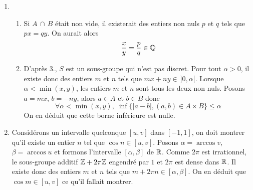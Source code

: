 \begin{enumerate}
\item
\begin{enumerate}
 \item Si $A \,\cap\, B$ {\'e}tait non vide, il existerait des entiers non nuls $p$ et $q$ tels que $px=qy$. On aurait alors
      \[\frac{x}{y}=\frac{p}{q}\in \mathbb{Q}\]
 \item D'apr{\`e}s 3., $S$ est un sous-groupe qui n'est pas discret. Pour tout $\alpha>0$, il existe donc des entiers $m$ et $n$ tels que $mx+ny\in \,]0,\alpha[$.\newline
Lorsque $\alpha < \min (x,y)$, les entiers $m$ et $n$ sont tous les deux non nuls. Posons $a=mx$, $b=-ny$, alors $a\in A$ et $b\in B$ donc
\begin{displaymath}
\forall \alpha < \min (x,y), \; \inf\{|a-b|,(a,b)\in A \times B\}\leq \alpha 
\end{displaymath}
On en d{\'e}duit que cette borne inf{\'e}rieure est nulle.
\end{enumerate}

\item Consid{\'e}rons un intervalle quelconque $[u,v]$ dans $[-1,1]$, on doit montrer qu'il existe un entier $n$ tel que $\cos n \in [u,v]$. \newline
Posons $\alpha = \arccos v$, $\beta = \arccos u$ et formons l'intervalle $[\alpha, \beta]$ de $\mathbb{R}$.\newline
Comme $2\pi$ est irrationnel, le sous-groupe additif  $\mathbb{Z}+2\pi\mathbb{Z}$ engendré par $1$ et $2\pi$ est dense dans $\mathbb{R}$. Il existe donc des entiers $m$ et $n$ tels que $m+2\pi n\in [\alpha, \beta]$. On en d{\'e}duit que $\cos m \in [u,v]$ ce qu'il fallait montrer.
\end{enumerate}
